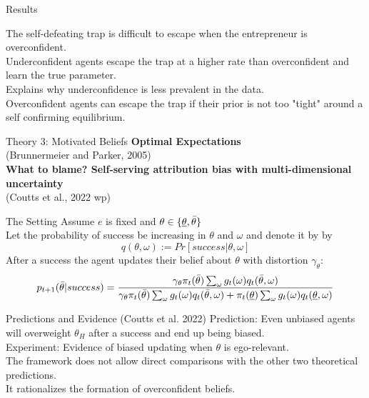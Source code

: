\documentclass[aspectratio=169]{beamer}
\begin{document}
\begin{frame}{Results}

    The self-defeating trap is difficult to escape when the entrepreneur is overconfident.\\
    \bigskip
    Underconfident agents escape the trap at a higher rate than overconfident and learn the true parameter.\\
    \bigskip
    Explains why underconfidence is less prevalent in the data.\\
    \bigskip
    Overconfident agents can escape the trap if their prior is not too "tight" around a self confirming equilibrium.
  
\end{frame}

\begin{frame}{Theory 3: Motivated Beliefs}
    \Large\textbf{Optimal Expectations}\\
    (Brunnermeier and Parker, 2005)\\
    \bigskip
    \Large\textbf{What to blame? Self-serving attribution bias with
multi-dimensional uncertainty}\\
    (Coutts et al., 2022 wp)
\end{frame}

\begin{frame}{The Setting}
    Assume $e$ is fixed and $\theta \in \{\underline{\theta}, \Bar{\theta}\}$ \\
    \bigskip
    Let the probability of success be increasing in $\theta$ and $\omega$ and denote it by by
    $$q(\theta, \omega):=Pr[success|\theta, \omega]$$
    After a success the agent updates their belief about $\theta$ with distortion $\gamma_\theta$:
    $$p_{t+1}(\Bar{\theta}|success)= \frac{\gamma_\theta\pi_t(\Bar{\theta})\sum_\omega g_t(\omega) q_t(\Bar\theta, \omega)}{\gamma_\theta\pi_t(\Bar{\theta})\sum_\omega g_t(\omega)q_t(\Bar{\theta}, \omega)+ \pi_t(\underline {\theta})\sum_\omega g_t(\omega) q_t(\underline{\theta}, \omega)}$$
    
\end{frame}

\begin{frame}{Predictions and Evidence (Coutts et al. 2022)}
    Prediction: Even unbiased agents will overweight $\theta
_H$ after a success and end up being biased.\\
    \bigskip
    Experiment: Evidence of biased updating when $\theta$ is ego-relevant.\\
    \bigskip
    The framework does not allow direct comparisons with the other two theoretical predictions.\\
    \bigskip
    It rationalizes the formation of overconfident beliefs.
    
    
\end{frame}
\end{document}
